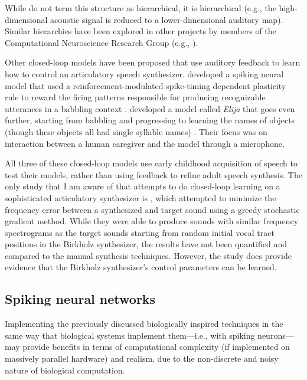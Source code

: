 \documentclass{article}
\begin{document}
While \citeauthor{kroger2009}
do not term this structure
as hierarchical,
it is hierarchical
(e.g., the high-dimensional acoustic
signal is reduced to a lower-dimensional
auditory map).
Similar hierarchies have been explored
in other projects by members of the
Computational Neuroscience Research Group
(e.g., \citealp{eliasmith2012,dewolf2011,rasmussen-inpress}).

Other closed-loop models
have been proposed
that use auditory feedback
to learn how to control
an articulatory speech synthesizer.
\citeauthor{warlaumont2012}
developed a spiking neural model
that used a reinforcement-modulated
spike-timing dependent plasticity rule
to reward the firing patterns
responsible for producing
recognizable utterances
in a babbling context
\citep{warlaumont2012,warlaumont2013}.
\citeauthor{howard2011} developed
a model called \textit{Elija}
that goes even further,
starting from babbling
and progressing to learning
the names of objects
(though these objects all had
single syllable names) \citep{howard2011}.
Their focus was on interaction
between a human caregiver
and the model through a microphone.

All three of these closed-loop models
use early childhood acquisition of speech
to test their models,
rather than using feedback
to refine adult speech synthesis.
The only study that I am aware of
that attempts to do closed-loop learning
on a sophisticated articulatory synthesizer
is \citet{prom2013}, which attempted
to minimize the frequency error
between a synthesized and target sound
using a greedy stochastic gradient method.
While they were able to produce
sounds with similar frequency spectrograms
as the target sounds starting from
random initial vocal tract positions
in the Birkholz synthesizer,
the results have not been quantified
and compared to the manual
synthesis techniques.
However, the study does provide
evidence that the Birkholz synthesizer's
control parameters can be learned.

\subsection{Spiking neural networks}
\label{subsec:spiking}

Implementing the previously discussed
biologically inspired techniques in the same way
that biological systems implement
them---i.e., with spiking neurons---may
provide benefits in terms of
computational complexity
(if implemented on massively parallel hardware)
and realism, due to the non-discrete
and noisy nature of biological computation.
\end{document}
